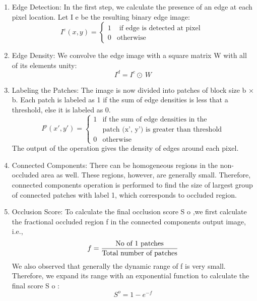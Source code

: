 \documentclass[conference]{IEEEtran}
\begin{document}
\begin{enumerate}
    \item Edge Detection: In the first step, we calculate the presence of an edge at each pixel location. Let I e be the resulting binary edge image:
    \begin{equation}
    I^{e}(x,y)=
    \begin{cases}
      1 & \text{ if edge is detected at pixel }\\
      0 & \text{otherwise}
    \end{cases}
    \end{equation}
    \item Edge Density: We convolve the edge image with a square matrix W with all of its elements unity:
    \begin{equation}
    I^{d} = I^{e} \odot\ \textit{W}
    \end{equation}
    \item Labeling the Patches: The image is now divided into patches of block size b × b. Each patch is labeled as 1 if the sum of edge densities is less that a threshold, else it is labeled as 0.
    \begin{equation}
    I^{p}(x',y')=
    \begin{cases}
      1 & \text{if the sum of edge densities in the}\\ & \text{patch (x', y') is greater than threshold}\\0 & \text{otherwise}
    \end{cases}
    \end{equation}
    The output of the operation gives the density of edges around each pixel.
    \item Connected Components: There can be homogeneous regions in the non-occluded area as well. These regions, however, are generally small. Therefore, connected components operation is performed to find the size of largest group of connected patches with label 1, which corresponds to occluded region.
    \item Occlusion Score: To calculate the final occlusion score S o ,we first calculate the fractional occluded region f in the connected components output image, i.e.,
    \begin{equation}
    f = \frac{\textnormal{No\ of\ 1\ patches}}{\textnormal{Total\ number\ of\ patches}}
\end{equation}
We also observed that generally the dynamic range of f is very small. Therefore, we expand its range with an exponential function to calculate the final score S o :
\begin{equation}
S^{o} = 1 - e^{-f}
\end{equation}
\end{enumerate}
\end{document}
